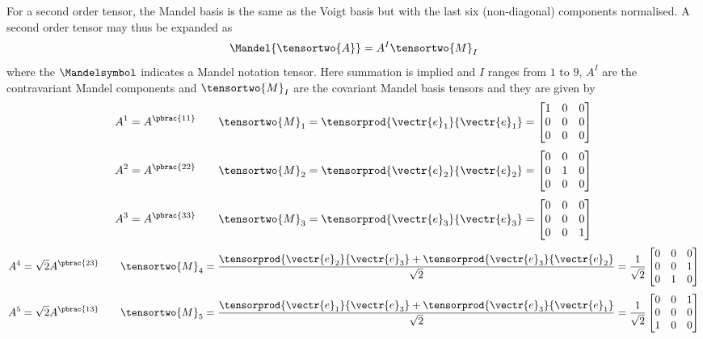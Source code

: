 For a second order tensor, the Mandel basis is the same as the Voigt
basis but with the last six (non-diagonal) components normalised. A second order tensor may thus be expanded as
\begin{equation}
  \Mandel{\tensortwo{A}}=A^{I}\tensortwo{M}_{I}
\end{equation}
where
the $\Mandelsymbol$ indicates a Mandel notation tensor. Here
summation is implied and $I$ ranges from $1$ to $9$, $A^{I}$ are the
contravariant Mandel components and $\tensortwo{M}_{I}$ are the covariant
Mandel basis tensors and they are given by
\begin{equation}
  A^{1}=A^{\pbrac{11}} \qquad
  \tensortwo{M}_{1}=\tensorprod{\vectr{e}_{1}}{\vectr{e}_{1}}=\begin{bmatrix}
  1 & 0 & 0 \\
  0 & 0 & 0 \\
  0 & 0 & 0
  \end{bmatrix}
\end{equation}
\begin{equation}
  A^{2}=A^{\pbrac{22}} \qquad
  \tensortwo{M}_{2}=\tensorprod{\vectr{e}_{2}}{\vectr{e}_{2}}=\begin{bmatrix}
  0 & 0 & 0 \\
  0 & 1 & 0 \\
  0 & 0 & 0
  \end{bmatrix}
\end{equation}
\begin{equation}
  A^{3}=A^{\pbrac{33}} \qquad
  \tensortwo{M}_{3}=\tensorprod{\vectr{e}_{3}}{\vectr{e}_{3}}=\begin{bmatrix}
  0 & 0 & 0 \\
  0 & 0 & 0 \\
  0 & 0 & 1
  \end{bmatrix}
\end{equation}
\begin{equation}
  A^{4}=\sqrt{2}A^{\pbrac{23}} \qquad
  \tensortwo{M}_{4}=\dfrac{\tensorprod{\vectr{e}_{2}}{\vectr{e}_{3}}+\tensorprod{\vectr{e}_{3}}{\vectr{e}_{2}}}{\sqrt{2}}=
  \dfrac{1}{\sqrt{2}}\begin{bmatrix}
    0 & 0 & 0 \\
    0 & 0 & 1 \\
    0 & 1 & 0
  \end{bmatrix}
\end{equation}
\begin{equation}
  A^{5}=\sqrt{2}A^{\pbrac{13}} \qquad
  \tensortwo{M}_{5}=\dfrac{\tensorprod{\vectr{e}_{1}}{\vectr{e}_{3}}+\tensorprod{\vectr{e}_{3}}{\vectr{e}_{1}}}{\sqrt{2}}=
  \dfrac{1}{\sqrt{2}}\begin{bmatrix}
    0 & 0 & 1 \\
    0 & 0 & 0 \\
    1 & 0 & 0
  \end{bmatrix}
\end{equation}
